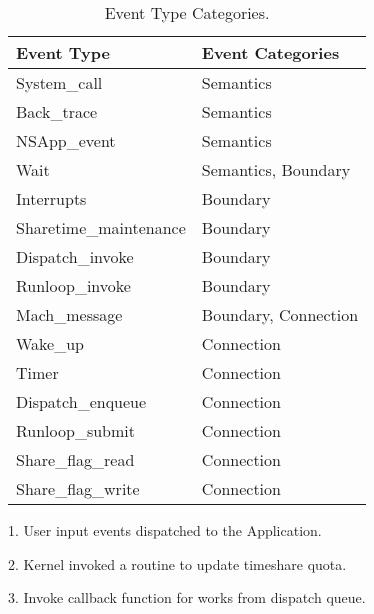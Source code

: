\begin{table}[ht]
  \centering
  \begin{tabularx}{\columnwidth}{|X|X|}
  	\hline
    \textbf{Event Type} & \textbf{Event Categories}\\
	\hline
	\hline
		System\_call & Semantics\\ \hline
		Back\_trace & Semantics\\ \hline
		NSApp\_event\footnotemark[1] & Semantics \\ \hline
		Wait & Semantics, Boundary \\ \hline
		Interrupts & Boundary \\ \hline
		Sharetime\_maintenance\footnotemark[2] & Boundary \\ \hline
		Dispatch\_invoke\footnotemark[3] & Boundary \\ \hline
		Runloop\_invoke & Boundary \\ \hline
		Mach\_message & Boundary, Connection\\ \hline
		Wake\_up & Connection \\ \hline
		Timer & Connection \\ \hline
		Dispatch\_enqueue & Connection \\ \hline
		Runloop\_submit & Connection \\ \hline
		Share\_flag\_read & Connection \\ \hline
		Share\_flag\_write & Connection \\ \hline
  \end{tabularx}

	\begin{tablenotes}
		\footnotesize
		\item 1. User input events dispatched to the Application.
		\item 2. Kernel invoked a routine to update timeshare quota. 
		\item 3. Invoke callback function for works from dispatch queue.
	\end{tablenotes}
	\caption{Event Type Categories. }
  \label{table:event_types}
\end{table}

